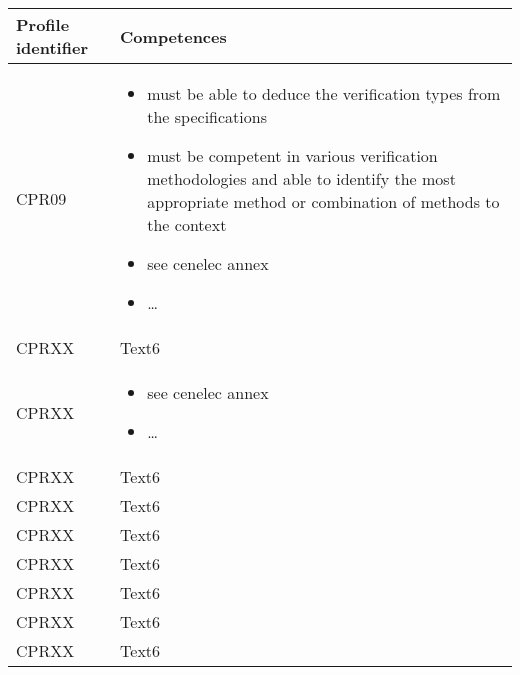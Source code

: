 \documentclass{template/openetcs_article}
\begin{document}
\begin{flushleft}
\tablefirsthead{}
\tablehead{}
\tabletail{}
\tablelasttail{}
\begin{supertabular}{|m{3cm}|m{12cm}|}
\hline
{}
Profile identifier&
Competences\\\hline
CPR09 &
\begin{itemize}
\item must be able to deduce the verification types from the specifications
\item must be competent in various verification methodologies and able to identify the most appropriate method or combination of methods to the context 
\item see cenelec annex
\item {\dots}
\end{itemize}
\\\hline
CPRXX &
Text6\\\hline
CPRXX &
\begin{itemize}
\item see cenelec annex
\item {\dots}
\end{itemize}
\\\hline
CPRXX &
Text6\\\hline
CPRXX &
Text6\\\hline
CPRXX &
Text6\\\hline
CPRXX &
Text6\\\hline
CPRXX &
Text6\\\hline
CPRXX &
Text6\\\hline
CPRXX &
Text6\\\hline
\end{supertabular}
\end{flushleft}
\end{document}
